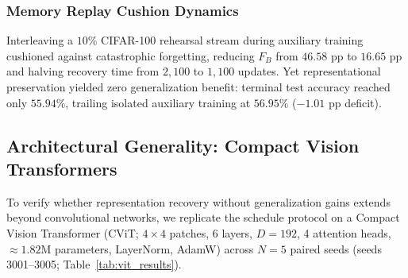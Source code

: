 \documentclass[sn-mathphys,Numbered]{sn-jnl}
\begin{document}
\subsubsection{Memory Replay Cushion Dynamics}
Interleaving a $10\%$ CIFAR-100 rehearsal stream during auxiliary training cushioned against catastrophic forgetting, reducing $F_B$ from $46.58$ pp to $16.65$ pp and halving recovery time from $2{,}100$ to $1{,}100$ updates. Yet representational preservation yielded zero generalization benefit: terminal test accuracy reached only $55.94\%$, trailing isolated auxiliary training at $56.95\%$ ($-1.01$ pp deficit).

\subsection{Architectural Generality: Compact Vision Transformers}\label{subsec:results_vit}

To verify whether representation recovery without generalization gains extends beyond convolutional networks, we replicate the schedule protocol on a Compact Vision Transformer (CViT; $4 \times 4$ patches, 6 layers, $D = 192$, 4 attention heads, $\approx 1.82\mathrm{M}$ parameters, LayerNorm, AdamW) across $N = 5$ paired seeds (seeds 3001--3005; Table~\ref{tab:vit_results}).
\end{document}
